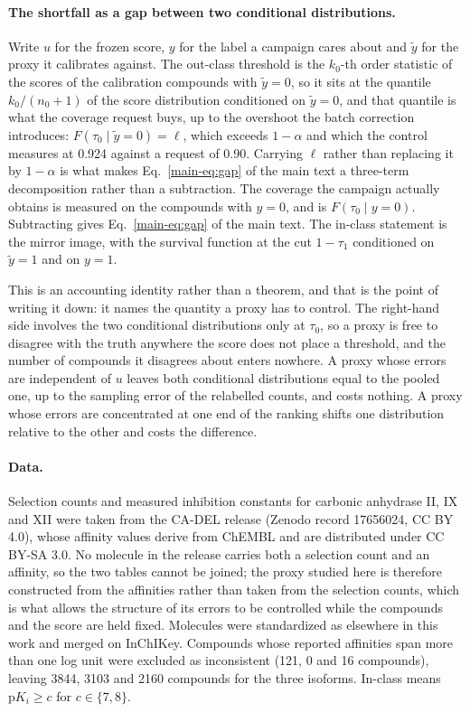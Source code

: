 \documentclass[10pt]{article}
\begin{document}
\paragraph{The shortfall as a gap between two conditional distributions.} Write $u$ for the frozen score, $y$ for the label a campaign cares about and $\tilde y$ for the proxy it calibrates against. The out-class threshold is the $k_0$-th order statistic of the scores of the calibration compounds with $\tilde y=0$, so it sits at the quantile $k_0/(n_0+1)$ of the score distribution conditioned on $\tilde y=0$, and that quantile is what the coverage request buys, up to the overshoot the batch correction introduces: $F(\tau_0\mid\tilde y=0)=\ell$, which exceeds $1-\alpha$ and which the control measures at 0.924 against a request of 0.90. Carrying $\ell$ rather than replacing it by $1-\alpha$ is what makes Eq.~\ref{main-eq:gap} of the main text a three-term decomposition rather than a subtraction. The coverage the campaign actually obtains is measured on the compounds with $y=0$, and is $F(\tau_0\mid y=0)$. Subtracting gives Eq.~\ref{main-eq:gap} of the main text. The in-class statement is the mirror image, with the survival function at the cut $1-\tau_1$ conditioned on $\tilde y=1$ and on $y=1$.

This is an accounting identity rather than a theorem, and that is the point of writing it down: it names the quantity a proxy has to control. The right-hand side involves the two conditional distributions only at $\tau_0$, so a proxy is free to disagree with the truth anywhere the score does not place a threshold, and the number of compounds it disagrees about enters nowhere. A proxy whose errors are independent of $u$ leaves both conditional distributions equal to the pooled one, up to the sampling error of the relabelled counts, and costs nothing. A proxy whose errors are concentrated at one end of the ranking shifts one distribution relative to the other and costs the difference.

\paragraph{Data.} Selection counts and measured inhibition constants for carbonic anhydrase II, IX and XII were taken from the CA-DEL release\citep{He2026CADEL} (Zenodo record 17656024, CC BY 4.0), whose affinity values derive from ChEMBL\citep{Zdrazil2024ChEMBL} and are distributed under CC BY-SA 3.0. No molecule in the release carries both a selection count and an affinity, so the two tables cannot be joined; the proxy studied here is therefore constructed from the affinities rather than taken from the selection counts, which is what allows the structure of its errors to be controlled while the compounds and the score are held fixed. Molecules were standardized as elsewhere in this work and merged on InChIKey. Compounds whose reported affinities span more than one log unit were excluded as inconsistent (121, 0 and 16 compounds), leaving 3844, 3103 and 2160 compounds for the three isoforms. In-class means $\mathrm{p}K_i\ge c$ for $c\in\{7,8\}$.
\end{document}
